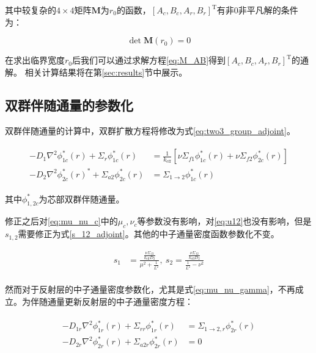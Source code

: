 其中较复杂的$4\times4$矩阵$\pmb{M}$为$r_0$的函数，$\left[A_c,B_c,A_r,B_r\right]^{\mathrm{T}}$有非$0$非平凡解的条件为：

\begin{equation}
    \det \pmb{M}(r_0) = 0
\end{equation}

在求出临界宽度$r_0$后我们可以通过求解方程\ref{eq:M_AB}得到$\left[A_c,B_c,A_r,B_r\right]^{\mathrm{T}}$的通解。
相关计算结果将在第\ref{sec:results}节中展示。

\subsection{双群伴随通量的参数化}

双群伴随通量的计算中，双群扩散方程将修改为式\ref{eq:two3_group_adjoint}。

\begin{align}
    \label{eq:two3_group_adjoint}
    \begin{split}
        -D_1\nabla^2\phi_{1c}^*(r) + \Sigma_r\phi_{1c}^*(r) &= \frac{1}{k_\mathrm{eff}}\left[\nu\Sigma_{f1}\phi_{1c}^*(r)+\nu\Sigma_{f2}\phi_{2c}^*(r)\right] \\
        -D_2\nabla^2\phi_{2c}^*(r)^* + \Sigma_{a2}\phi_{2c}^*(r) &= \Sigma_{1\rightarrow 2}\phi_{1c}^*(r)
    \end{split}
\end{align}

其中$\phi_{1,2c}^*$为芯部双群伴随通量。

修正之后对\ref{eq:mu_nu_c}中的$\mu_c,\nu_c$等参数没有影响，对\ref{eq:u12}也没有影响，但是$s_{1,2}$需要修正为式\ref{s_12_adjoint}。其他的中子通量密度函数参数化不变。

\begin{align}
    \label{s_12_adjoint}
    s_1 &= \frac{\frac{\nu\Sigma_{f2}}{k_\mathrm{eff}D_2}}{\mu^2 + \frac{1}{L^2}},\ s_2 = \frac{\frac{\nu\Sigma_{f2}}{k_\mathrm{eff}D_2}}{\frac{1}{L^2}-\nu^2} \\
\end{align}

然而对于反射层的中子通量密度参数化，尤其是式\ref{eq:mu_nu_gamma}，不再成立。为伴随通量更新反射层的中子通量密度方程：

\begin{align}
    \label{eq:two_reflect_adjoint}
    \begin{split}
        -D_{1r}\nabla^2\phi_{1r}^*(r) + \Sigma_{rr}\phi_{1r}^*(r) &= \Sigma_{1\rightarrow 2,r}\phi_{2r}^*(r) \\
        -D_{2r}\nabla^2\phi_{2r}^*(r) + \Sigma_{a2r}\phi_{2r}^*(r) &= 0
    \end{split}
\end{align}

